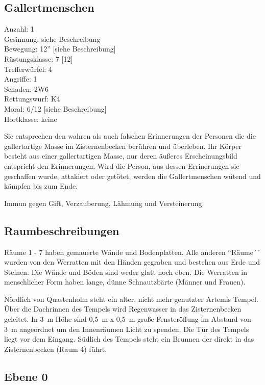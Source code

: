 \subsection{Gallertmenschen}

\begin{tabbing}
Anzahl: 1\\
Gesinnung: siehe Beschreibung\\
Bewegung: 12'' [siehe Beschreibung]\\
Rüstungsklasse: 7 [12]\\
Trefferwürfel: 4\\
Angriffe: 1\\
Schaden: 2W6\\
Rettungswurf: K4\\
Moral: 6/12 [siehe Beschreibung]\\
Hortklasse: keine\\
\end{tabbing}

Sie entsprechen den wahren als auch falschen Erinnerungen der Personen die
die gallertartige Masse im Zisternenbecken berühren und überleben. Ihr
Körper besteht aus einer gallertartigen Masse, nur deren äußeres
Erscheinungsbild entspricht den Erinnerungen. Wird die Person, aus
dessen Errinerungen sie geschaffen wurde, attakiert oder getötet,
werden die Gallertmenschen wütend und kämpfen bis zum Ende.

Immun gegen Gift, Verzauberung, Lähmung und Versteinerung.

\subsection{Raumbeschreibungen}

Räume 1 - 7 haben gemauerte Wände und Bodenplatten. Alle anderen
``Räume´´ wurden von den Werratten mit den Händen gegraben und bestehen
aus Erde und Steinen. Die Wände und Böden sind weder glatt noch eben.
Die Werratten in menschlicher Form haben lange, dünne Schnautzbärte
(Männer und Frauen).

Nördlich von Quastenholm steht ein alter, nicht mehr genutzter
Artemis Tempel. Über die Dachrinnen des Tempels wird Regenwasser
in das Zisternenbecken geleitet. In 3~m Höhe sind 0,5~m x 0,5~m große
Fensteröffung im Abstand von 3~m angeordnet um den Innenräumen Licht zu
spenden. Die Tür des Tempels liegt vor dem Eingang. Südlich des Tempels
steht ein Brunnen der direkt in das Zisternenbecken (Raum 4) führt.

\subsection{Ebene 0}

